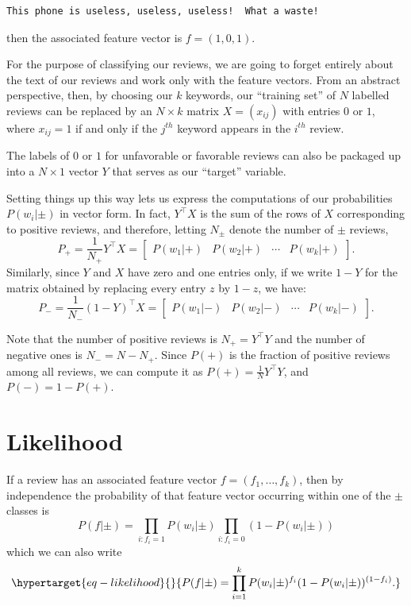 \documentclass[
  11pt,
  letterpaper,
]{scrbook}
\theoremstyle{plain}
\theoremstyle{remark}
\begin{document}
\begin{verbatim}
This phone is useless, useless, useless!  What a waste!
\end{verbatim}

then the associated feature vector is \(f=(1,0,1)\).

For the purpose of classifying our reviews, we are going to forget
entirely about the text of our reviews and work only with the feature
vectors. From an abstract perspective, then, by choosing our \(k\)
keywords, our ``training set'' of \(N\) labelled reviews can be replaced
by an \(N\times k\) matrix \(X=(x_{ij})\) with entries \(0\) or \(1\),
where \(x_{ij}=1\) if and only if the \(j^{th}\) keyword appears in the
\(i^{th}\) review.

The labels of \(0\) or \(1\) for unfavorable or favorable reviews can
also be packaged up into a \(N\times 1\) vector \(Y\) that serves as our
``target'' variable.

Setting things up this way lets us express the computations of our
probabilities \(P(w_{i}|\pm)\) in vector form. In fact,
\(Y^{\intercal}X\) is the sum of the rows of \(X\) corresponding to
positive reviews, and therefore, letting \(N_{\pm}\) denote the number
of \(\pm\) reviews, \[
P_{+} = \frac{1}{N_{+}}Y^{\intercal}X = \left[\begin{array}{cccc} P(w_{1}|+)& P(w_{2}|+) & \cdots &P(w_{k}|+)\end{array}\right].
\] Similarly, since \(Y\) and \(X\) have zero and one entries only, if
we write \(1-Y\) for the matrix obtained by replacing every entry \(z\)
by \(1-z\), we have: \[
P_{-} = \frac{1}{N_{-}}(1-Y)^{\intercal}X =  \left[\begin{array}{cccc} P(w_{1}|-)& P(w_{2}|-) & \cdots &P(w_{k}|-)\end{array}\right].
\]

Note that the number of positive reviews is \(N_{+}=Y^{\intercal}Y\) and
the number of negative ones is \(N_{-}=N-N_{+}\). Since \(P(+)\) is the
fraction of positive reviews among all reviews, we can compute it as
\(P(+)=\frac{1}{N}Y^{\intercal}Y\), and \(P(-)=1-P(+)\).

\hypertarget{likelihood}{%
\section{Likelihood}\label{likelihood}}

If a review has an associated feature vector \(f=(f_1,\ldots, f_k)\),
then by independence the probability of that feature vector occurring
within one of the \(\pm\) classes is \[
P(f|\pm) = \prod_{i: f_{i}=1} P(w_{i}|\pm)\prod_{i: f_{i}=0}(1-P(w_{i}|\pm))
\] which we can also write
\begin{equation}\protect\hypertarget{eq-likelihood}{}{
P(f|\pm) = \prod_{i=1}^{k} P(w_{i}|\pm)^{f_{i}}(1-P(w_{i}|\pm))^{(1-f_{i})}.
}\label{eq-likelihood}\end{equation}
\end{document}
